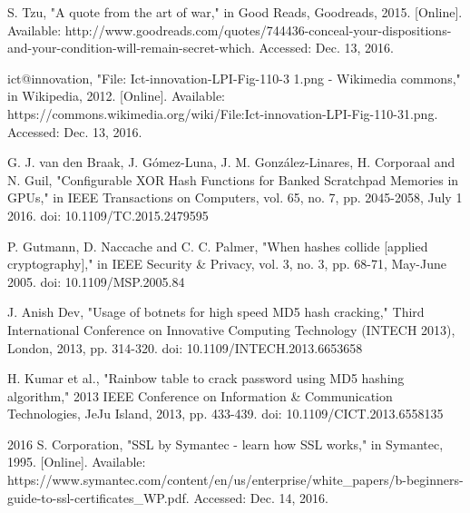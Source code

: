 \documentclass[journal]{IEEEtran}
\begin{document}

%
%
%
\begin{thebibliography}{1}


S. Tzu, "A quote from the art of war," in Good Reads, Goodreads, 2015. [Online]. Available: http://www.goodreads.com/quotes/744436-conceal-your-dispositions-and-your-condition-will-remain-secret-which. Accessed: Dec. 13, 2016.

ict@innovation, "File: Ict-innovation-LPI-Fig-110-3 1.png - Wikimedia commons," in Wikipedia, 2012. [Online]. Available: https://commons.wikimedia.org/wiki/File:Ict-innovation-LPI-Fig-110-31.png. Accessed: Dec. 13, 2016.

G. J. van den Braak, J. Gómez-Luna, J. M. González-Linares, H. Corporaal and N. Guil, "Configurable XOR Hash Functions for Banked Scratchpad Memories in GPUs," in IEEE Transactions on Computers, vol. 65, no. 7, pp. 2045-2058, July 1 2016.
doi: 10.1109/TC.2015.2479595

P. Gutmann, D. Naccache and C. C. Palmer, "When hashes collide [applied cryptography]," in IEEE Security \& Privacy, vol. 3, no. 3, pp. 68-71, May-June 2005.
doi: 10.1109/MSP.2005.84

J. Anish Dev, "Usage of botnets for high speed MD5 hash cracking," Third International Conference on Innovative Computing Technology (INTECH 2013), London, 2013, pp. 314-320.
doi: 10.1109/INTECH.2013.6653658

H. Kumar et al., "Rainbow table to crack password using MD5 hashing algorithm," 2013 IEEE Conference on Information \& Communication Technologies, JeJu Island, 2013, pp. 433-439.
doi: 10.1109/CICT.2013.6558135

2016 S. Corporation, "SSL by Symantec - learn how SSL works," in Symantec, 1995. [Online]. Available: https://www.symantec.com/content/en/us/enterprise/white\_papers/b-beginners-guide-to-ssl-certificates\_WP.pdf. Accessed: Dec. 14, 2016.


\end{thebibliography}
\end{document}
